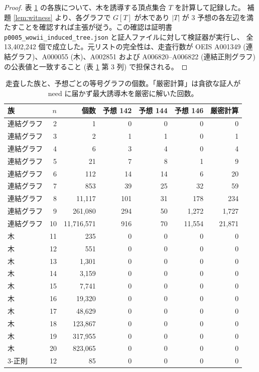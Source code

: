 \documentclass[paper=a4,fontsize=10.5pt,jafontsize=10.5pt]{jlreq}
\theoremstyle{plain}
\theoremstyle{definition}
\begin{document}
\begin{proof}
表 \ref{tab:fams} の各族について、木を誘導する頂点集合 $T$ を計算して記録した。
補題 \ref{lem:witness} より、各グラフで $G[T]$ が木であり $|T|$ が
3 予想の各左辺を満たすことを確認すれば主張が従う。この確認は証明書
\texttt{p0005\_wowii\_induced\_tree.json} と証人ファイルに対して検証器が実行し、
全 13,402,242 個で成立した。元リストの完全性は、走査行数が
OEIS A001349 (連結グラフ)、A000055 (木)、A002851 および
A006820--A006822 (連結正則グラフ) の公表値と一致すること
(表 \ref{tab:fams} 第 3 列) で担保される。
\end{proof}

\begin{table}[htbp]
\centering
\caption{走査した族と、予想ごとの等号グラフの個数。「厳密計算」は貪欲な証人が
$\mathrm{need}$ に届かず最大誘導木を厳密に解いた回数。}
\label{tab:fams}
\begin{tabular}{lrrrrrr}
\toprule
族 & $n$ & 個数 & 予想 142 & 予想 144 & 予想 146 & 厳密計算 \\
\midrule
連結グラフ & 2 & 1 & 0 & 0 & 0 & 0 \\
連結グラフ & 3 & 2 & 1 & 1 & 0 & 1 \\
連結グラフ & 4 & 6 & 3 & 4 & 0 & 4 \\
連結グラフ & 5 & 21 & 7 & 8 & 1 & 9 \\
連結グラフ & 6 & 112 & 14 & 14 & 6 & 20 \\
連結グラフ & 7 & 853 & 39 & 25 & 32 & 59 \\
連結グラフ & 8 & 11,117 & 101 & 31 & 178 & 234 \\
連結グラフ & 9 & 261,080 & 294 & 50 & 1,272 & 1,727 \\
連結グラフ & 10 & 11,716,571 & 916 & 70 & 11,554 & 21,871 \\
木 & 11 & 235 & 0 & 0 & 0 & 0 \\
木 & 12 & 551 & 0 & 0 & 0 & 0 \\
木 & 13 & 1,301 & 0 & 0 & 0 & 0 \\
木 & 14 & 3,159 & 0 & 0 & 0 & 0 \\
木 & 15 & 7,741 & 0 & 0 & 0 & 0 \\
木 & 16 & 19,320 & 0 & 0 & 0 & 0 \\
木 & 17 & 48,629 & 0 & 0 & 0 & 0 \\
木 & 18 & 123,867 & 0 & 0 & 0 & 0 \\
木 & 19 & 317,955 & 0 & 0 & 0 & 0 \\
木 & 20 & 823,065 & 0 & 0 & 0 & 0 \\
3-正則 & 12 & 85 & 0 & 0 & 0 & 0 \\

\end{tabular}
\end{table}
\end{document}
